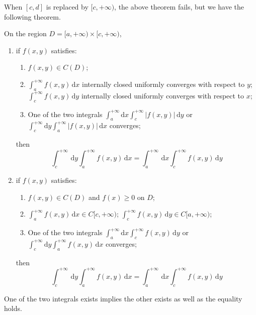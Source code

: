 \documentclass[11pt]{../../TexTemplate/elegantbook}
\begin{document}
When \([c, d]\) is replaced by \([c, +\infty)\), the above theorem fails,
but we have the following theorem.
\begin{theorem}
    On the region \(D = [a, +\infty) \times [c, +\infty)\),
    \begin{enumerate}
        \item if \(f(x, y)\) satisfies: 
        \begin{enumerate}
            \item \(f(x, y)\in C(D)\);
            \item \(\int_{a}^{+\infty} f(x, y) \, \mathrm{d}x\) internally closed uniformly converges with respect to \(y\);
                \(\int_{c}^{+\infty} f(x, y) \, \mathrm{d}y\) internally closed uniformly converges with respect to \(x\);
            \item One of the two integrals \(\int_{a}^{+\infty} \mathrm{d}x \int_{c}^{+\infty} |f(x, y)| \, \mathrm{d}y\)
                or \(\int_{c}^{+\infty} \mathrm{d}y \int_{a}^{+\infty} |f(x, y)| \, \mathrm{d}x\) converges;
        \end{enumerate}
        then
        \[
        \int_{c}^{+\infty} \, \mathrm{d}y\int_{a}^{+\infty} f(x, y) \, \mathrm{d}x = 
        \int_{a}^{+\infty} \, \mathrm{d}x\int_{c}^{+\infty} f(x, y) \, \mathrm{d}y
        \]
        \item if \(f(x, y)\) satisfies:
        \begin{enumerate}
            \item \(f(x, y)\in C(D)\) and \(f(x)\geqslant 0\) on \(D\);
            \item \(\int_{a}^{+\infty} f(x, y) \, \mathrm{d}x \in C[c, +\infty)\);
                \(\int_{c}^{+\infty} f(x, y) \, \mathrm{d}y \in C[a,+\infty)\);
            \item One of the two integrals \(\int_{a}^{+\infty} \mathrm{d}x \int_{c}^{+\infty} f(x, y) \, \mathrm{d}y\)
                or \(\int_{c}^{+\infty} \mathrm{d}y \int_{a}^{+\infty} f(x, y) \, \mathrm{d}x\) converges;
        \end{enumerate}
        then
        \[
        \int_{c}^{+\infty} \, \mathrm{d}y\int_{a}^{+\infty} f(x, y) \, \mathrm{d}x = 
        \int_{a}^{+\infty} \, \mathrm{d}x\int_{c}^{+\infty} f(x, y) \, \mathrm{d}y
        \]
    \end{enumerate}
\end{theorem}

\begin{remark}
    One of the two integrals exists implies the other exists as well as the equality holds.
\end{remark}
\end{document}

